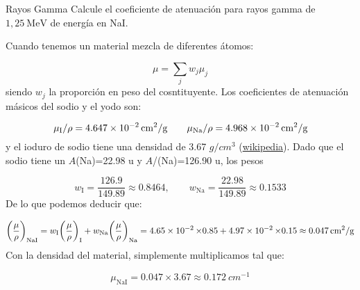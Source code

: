\begingroup
\makeatletter
\let\old@floatboxreset\@floatboxreset
\def\@floatboxreset{\old@floatboxreset\centering} %
\makeatother

\endgroup



\begin{Ejercicio}{Rayos Gamma}
Calcule el coeficiente de atenuación para rayos gamma de $1,25\ \text{MeV}$ de energía en NaI.
\end{Ejercicio}

Cuando tenemos un material mezcla de diferentes átomos: 

\begin{equation}
    \mu = \sum_j w_j \mu_j
\end{equation}
siendo $w_j$ la proporción en peso del cosntituyente. Los coeficientes de atenuación másicos del sodio y el yodo son: 

\begin{equation}
    \mu_{\text{I}}/\rho=\SI{4.647e-02}{cm^2/g} \qquad 
    \mu_{\text{Na}}/\rho=\SI{4.968E-02}{cm^2/g}  
\end{equation}
y el ioduro de sodio tiene una densidad de 3.67 $\unit{g/cm^3}$ (\href{https://es.wikipedia.org/wiki/Yoduro_de_sodio}{wikipedia}). Dado que el sodio tiene un $A$(Na)=22.98 u y $A$/(Na)=126.90 u, los pesos

\begin{equation}
    w_{\text{I}} = \frac{126.9}{149.89} \approx 0.8464, 
    \qquad 
    w_{\text{Na}} = \frac{22.98}{149.89} \approx 0.1533
\end{equation}
De lo que podemos deducir que: 

\begin{equation}
    \pqty{\frac{\mu}{\rho}}_{\text{NaI}} =  w_{\text{I}}\pqty{\frac{\mu}{\rho}}_{\text{I}} + w_{\text{Na}} \pqty{\frac{\mu}{\rho}}_{\text{Na}}= \SI{4.65e-2} \times 0.85 + \SI{4.97e-2} \times 0.15 \approx \SI{0.047}{cm^2/g}
\end{equation}
Con la densidad del material, simplemente multiplicamos tal que: 

\begin{equation}
    {\mu}_{\text{NaI}} = 0.047 \times 3.67 \approx \SI{0.172}{cm^{-1}}
\end{equation}


